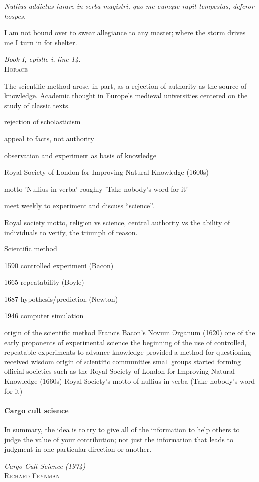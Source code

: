 \documentclass[ChapterTOCs,krantz2]{krantz} %
\begin{document}
\setlength{\epigraphrule}{0pt}
\setlength{\epigraphwidth}{.65\textwidth}
\epigraph%
{%
  \emph{Nullius addictus iurare in verba magistri,
  quo me cumque rapit tempestas, deferor hospes.}

  I am not bound over to swear allegiance to any master; where the storm
  drives me I turn in for shelter.
}%
{\textit{Book I, epistle i, line 14.}\\ \textsc{Horace} }

The scientific method arose, in part, as a rejection of authority as
the source of knowledge. Academic thought in Europe's medieval universities
centered on the study of classic texts.

rejection of scholasticism

appeal to facts, not authority

observation and experiment as basis of knowledge

Royal Society of London for Improving Natural Knowledge (1600s)

motto 'Nullius in verba' roughly 'Take nobody's word for it'

meet weekly to experiment and discuss ``science''. 

Royal society motto, religion vs science, central authority vs the
ability of individuals to verify, the triumph of reason.

Scientific method

1590  controlled experiment (Bacon)

1665  repeatability (Boyle)

1687  hypothesis/prediction (Newton)

1946  computer simulation

    origin of the scientific method
        Francis Bacon's Novum Organum (1620) one of the early proponents of experimental science
        the beginning of the use of controlled, repeatable experiments to advance knowledge
        provided a method for questioning received wisdom
    origin of scientific communities
        small groups started forming
        official societies such as the Royal Society of London for Improving Natural Knowledge (1660s)
            Royal Society's motto of nullius in verba (Take nobody's word for it)

\paragraph{ {\bf Cargo cult science}}

\setlength{\epigraphrule}{0pt}
\setlength{\epigraphwidth}{.65\textwidth}
\epigraph%
{%
  In summary, the idea is to try to give all of the information to
  help others to judge the value of your contribution; not just the
  information that leads to judgment in one particular direction or
  another.
}%
{\textit{Cargo Cult Science (1974)}\\ \textsc{Richard Feynman} }
\end{document}
